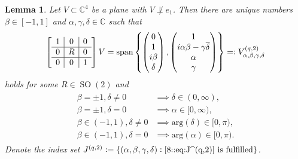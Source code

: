 \documentclass[10pt,a4paper]{amsart}
\newtheorem{lemma}{Lemma}
\newcommand{\C}{\mathbb{C}}
\DeclareMathOperator{\SO}{SO}
\DeclareMathOperator{\spann}{span}
\begin{document}
\begin{lemma}
\label{ntg::lemma:2edges_plane_classification}
    Let $V \subset \C^4$ be a plane with $V \not \perp e_1$. 
    Then there are unique numbers $\beta \in [-1, 1]$ and $\alpha, \gamma, \delta \in \C$ such that 
    \begin{align*}
        \left[\begin{array}{c|c|c}
            1& 0 & 0 \\
            \hline
            0 & R & 0 \\
            \hline 
            0 & 0 & 1
            \end{array}\right]
        V = 
            \spann \left\{ \begin{pmatrix}
                0 \\ 1 \\ i \beta \\ \delta
            \end{pmatrix}, \begin{pmatrix}
                1 \\ i \alpha \beta - \gamma \overline{\delta} \\ \alpha \\ \gamma
            \end{pmatrix} \right\}
            =\vcentcolon V^{(q,2)}_{\alpha,\beta,\gamma,\delta}
    \end{align*}
    holds for some $R \in \SO(2)$ and
    \begin{align}
        \label{8::eq:J^(q,2)}\tag{$\ast$}
        \begin{aligned}
            \beta = \pm 1, \delta \neq 0 &\implies \delta \in (0, \infty), \\
            \beta = \pm 1, \delta = 0 &\implies \alpha \in [0, \infty), \\
            \beta \in (-1,1), \delta \neq 0 &\implies \mathrm{arg}(\delta) \in [0, \pi), \\
            \beta \in (-1,1), \delta = 0 &\implies \mathrm{arg}(\alpha) \in [0, \pi).
        \end{aligned}
    \end{align}
    Denote the index set 
    $J^{(q,2)}\vcentcolon=
        \{(\alpha,\beta,\gamma,\delta)\vcentcolon\text{\eqref{8::eq:J^(q,2)} is fulfilled}\}$.
\end{lemma}
\end{document}
